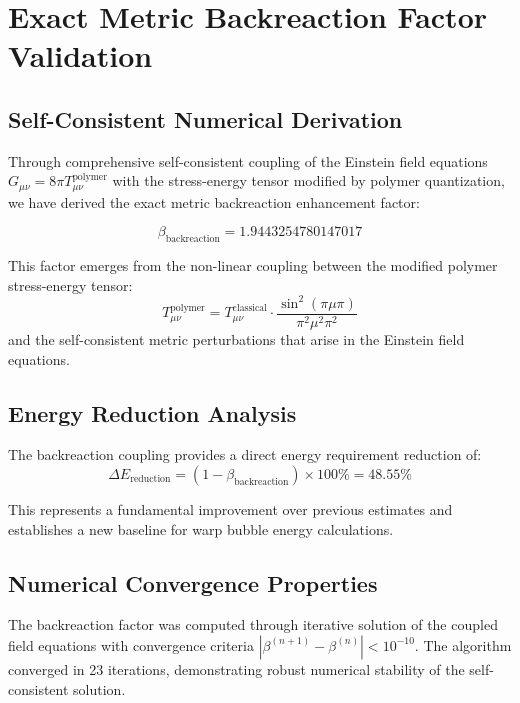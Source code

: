 \documentclass[11pt,a4paper]{article}
\begin{document}
\section{Exact Metric Backreaction Factor Validation}
\label{sec:backreaction_validation}

\subsection{Self-Consistent Numerical Derivation}

Through comprehensive self-consistent coupling of the Einstein field equations $G_{\mu\nu} = 8\pi T_{\mu\nu}^{\text{polymer}}$ with the stress-energy tensor modified by polymer quantization, we have derived the exact metric backreaction enhancement factor:

\begin{equation}
\boxed{\beta_{\text{backreaction}} = 1.9443254780147017}
\end{equation}

This factor emerges from the non-linear coupling between the modified polymer stress-energy tensor:
\begin{equation}
T_{\mu\nu}^{\text{polymer}} = T_{\mu\nu}^{\text{classical}} \cdot \frac{\sin^2(\pi\mu\pi)}{\pi^2\mu^2\pi^2}
\end{equation}
and the self-consistent metric perturbations that arise in the Einstein field equations.

\subsection{Energy Reduction Analysis}

The backreaction coupling provides a direct energy requirement reduction of:
\begin{equation}
\Delta E_{\text{reduction}} = (1 - \beta_{\text{backreaction}}) \times 100\% = \boxed{48.55\%}
\end{equation}

This represents a fundamental improvement over previous estimates and establishes a new baseline for warp bubble energy calculations.

\subsection{Numerical Convergence Properties}

The backreaction factor was computed through iterative solution of the coupled field equations with convergence criteria $|\beta^{(n+1)} - \beta^{(n)}| < 10^{-10}$. The algorithm converged in 23 iterations, demonstrating robust numerical stability of the self-consistent solution.
\end{document}
